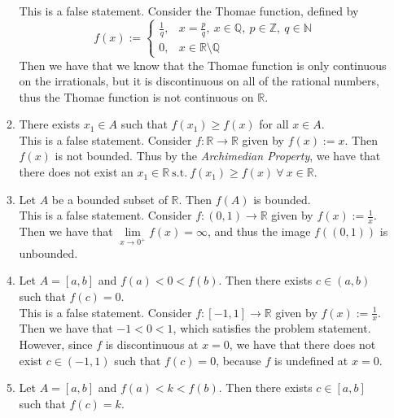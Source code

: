 \documentclass[12pt,letterpaper]{article}
\newcommand{\st}{\ \text{s.t.}\ }
\newcommand{\R}{\mathbb{R}}
\newcommand{\N}{\mathbb{N}}
\newcommand{\Q}{\mathbb{Q}}
\newcommand{\Z}{\mathbb{Z}}
\theoremstyle{case}
\theoremstyle{definition}
\begin{document}
\begin{enumerate}
\begin{enumerate}
				This is a false statement. Consider the Thomae function, defined by \[f(x):= \begin{cases}
					\frac{1}{q}, & x=\frac{p}{q},\ x \in \Q,\ p \in \Z,\ q \in \N \\
					0, & x \in \R \setminus \Q
				\end{cases}\]
				Then we have that we know that the Thomae function is only continuous on the irrationals, but it is discontinuous on all of the rational numbers, thus the Thomae function is not continuous on $\R$.\\
				\item There exists $x_1 \in A$ such that $f(x_1) \geq f(x)$ for all $x \in A$.\\
				
				This is a false statement. Consider $f:\R \to \R$ given by $f(x):=x$. Then $f(x)$ is not bounded. Thus by the \textit{Archimedian Property}, we have that there does not exist an $x_1 \in \R \st f(x_1) \geq f(x)\ \forall\ x \in \R$.\\
				\item Let $A$ be a bounded subset of $\R$. Then $f(A)$ is bounded.\\
				
				This is a false statement. Consider $f:(0,1) \to \R$ given by $f(x):=\frac{1}{x}$. Then we have that $\lim\limits_{x \to 0^+} f(x) = \infty$, and thus the image $f((0,1))$ is unbounded.\\
				\item Let $A=[a,b]$ and $f(a)<0<f(b)$. Then there exists $c \in (a,b)$ such that $f(c)=0$.\\
				
				This is a false statement. Consider $f:[-1,1] \to \R$ given by $f(x):=\frac{1}{x}$. Then we have that $-1 < 0 < 1$, which satisfies the problem statement. However, since $f$ is discontinuous at $x=0$, we have that there does not exist $c \in (-1,1)$ such that $f(c)=0$, because $f$ is undefined at $x=0$.\\
				\item Let $A=[a,b]$ and $f(a)<k<f(b)$. Then there exists $c \in [a,b]$ such that $f(c)=k$.\\
				

\end{enumerate}
\end{enumerate}
\end{document}
